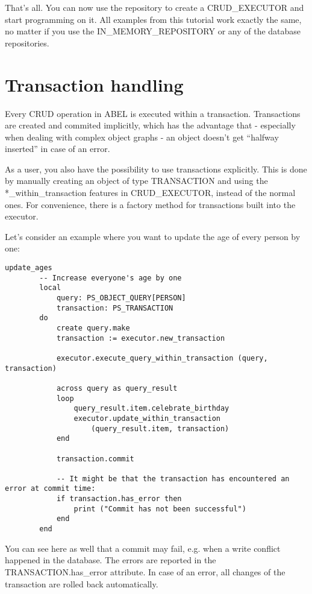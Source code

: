 That's all. You can now use the repository to create a CRUD\_EXECUTOR and start programming on it.
All examples from this tutorial work exactly the same, no matter if you use the IN\_MEMORY\_REPOSITORY or any of the database repositories.


\section{Transaction handling}

Every CRUD operation in ABEL is executed within a transaction. 
Transactions are created and commited implicitly, which has the advantage that - especially when dealing with complex object graphs - an object doesn't get ``halfway inserted'' in case of an error.

As a user, you also have the possibility to use transactions explicitly. 
This is done by manually creating an object of type TRANSACTION and using the *\_within\_transaction features in CRUD\_EXECUTOR, instead of the normal ones.
For convenience, there is a factory method for transactions built into the executor.

Let's consider an example where you want to update the age of every person by one:

\begin{lstlisting}[language=OOSC2Eiffel, captionpos=b, caption={}, label={lst:update_all_ages}]
	update_ages
		-- Increase everyone's age by one
		local
			query: PS_OBJECT_QUERY[PERSON]
			transaction: PS_TRANSACTION
		do
			create query.make
			transaction := executor.new_transaction

			executor.execute_query_within_transaction (query, transaction)

			across query as query_result
			loop
				query_result.item.celebrate_birthday
				executor.update_within_transaction 
					(query_result.item, transaction)
			end

			transaction.commit

			-- It might be that the transaction has encountered an error at commit time:
			if transaction.has_error then
				print ("Commit has not been successful")
			end
		end
\end{lstlisting}

You can see here as well that a commit may fail, e.g. when a write conflict happened in the database.
The errors are reported in the TRANSACTION.has\_error attribute.
In case of an error, all changes of the transaction are rolled back automatically.

